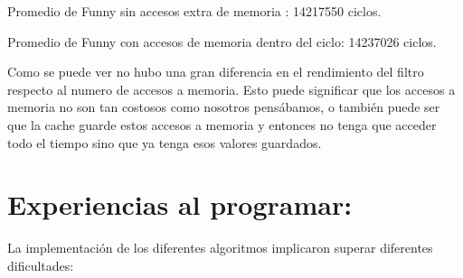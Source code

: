 \documentclass[a4paper]{article}
\begin{document}
\begin{itemize}
    Promedio de Funny sin accesos extra de memoria : 14217550 ciclos.
    
    
    Promedio de Funny con accesos de memoria dentro del ciclo: 14237026 ciclos.
    
     Como se puede ver no hubo una gran diferencia en el rendimiento del filtro respecto al numero de accesos a memoria. Esto puede significar que los accesos a memoria no son tan costosos como nosotros pensábamos, o también puede ser que la cache guarde estos accesos a memoria y entonces no tenga que acceder todo el tiempo sino que ya tenga esos valores guardados.
    
        
    


\end{itemize}
\section{Experiencias al programar:} La implementación de los diferentes algoritmos implicaron superar diferentes dificultades:
\end{document}
